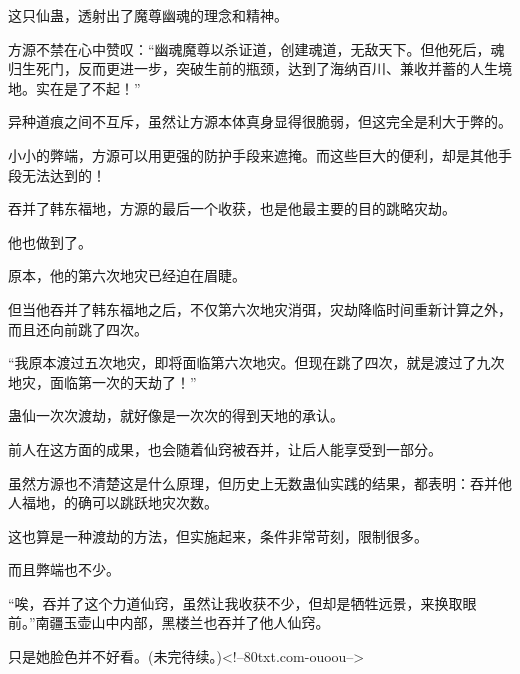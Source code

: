 \begin{this_body}
这只仙蛊，透射出了魔尊幽魂的理念和精神。

方源不禁在心中赞叹：“幽魂魔尊以杀证道，创建魂道，无敌天下。但他死后，魂归生死门，反而更进一步，突破生前的瓶颈，达到了海纳百川、兼收并蓄的人生境地。实在是了不起！”

异种道痕之间不互斥，虽然让方源本体真身显得很脆弱，但这完全是利大于弊的。

小小的弊端，方源可以用更强的防护手段来遮掩。而这些巨大的便利，却是其他手段无法达到的！

吞并了韩东福地，方源的最后一个收获，也是他最主要的目的跳略灾劫。

他也做到了。

原本，他的第六次地灾已经迫在眉睫。

但当他吞并了韩东福地之后，不仅第六次地灾消弭，灾劫降临时间重新计算之外，而且还向前跳了四次。

“我原本渡过五次地灾，即将面临第六次地灾。但现在跳了四次，就是渡过了九次地灾，面临第一次的天劫了！”

蛊仙一次次渡劫，就好像是一次次的得到天地的承认。

前人在这方面的成果，也会随着仙窍被吞并，让后人能享受到一部分。

虽然方源也不清楚这是什么原理，但历史上无数蛊仙实践的结果，都表明：吞并他人福地，的确可以跳跃地灾次数。

这也算是一种渡劫的方法，但实施起来，条件非常苛刻，限制很多。

而且弊端也不少。

“唉，吞并了这个力道仙窍，虽然让我收获不少，但却是牺牲远景，来换取眼前。”南疆玉壶山中内部，黑楼兰也吞并了他人仙窍。

只是她脸色并不好看。(未完待续。)<!--80txt.com-ouoou-->

\end{this_body}

